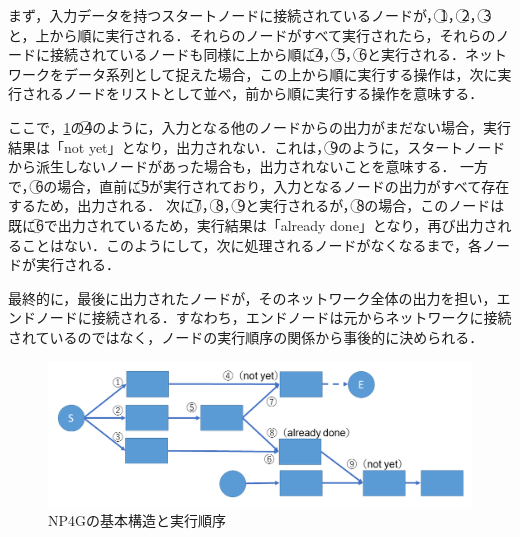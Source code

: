 \documentclass[exploratorypaper]{jsaiart} %
\begin{document}
まず，入力データを持つスタートノードに接続されているノードが，\textcircled{\scriptsize 1}，\textcircled{\scriptsize 2}，\textcircled{\scriptsize 3}と，上から順に実行される．それらのノードがすべて実行されたら，それらのノードに接続されているノードも同様に上から順に\textcircled{\scriptsize 4}，\textcircled{\scriptsize 5}，\textcircled{\scriptsize 6}と実行される．ネットワークをデータ系列として捉えた場合，この上から順に実行する操作は，次に実行されるノードをリストとして並べ，前から順に実行する操作を意味する．

ここで，\ref{fig:sequence}の\textcircled{\scriptsize 4}のように，入力となる他のノードからの出力がまだない場合，実行結果は「not yet」となり，出力されない．これは，\textcircled{\scriptsize 9}のように，スタートノードから派生しないノードがあった場合も，出力されないことを意味する．
一方で，\textcircled{\scriptsize 6}の場合，直前に\textcircled{\scriptsize 5}が実行されており，入力となるノードの出力がすべて存在するため，出力される．
次に\textcircled{\scriptsize 7}，\textcircled{\scriptsize 8}，\textcircled{\scriptsize 9}と実行されるが，\textcircled{\scriptsize 8}の場合，このノードは既に\textcircled{\scriptsize 6}で出力されているため，実行結果は「already done」となり，再び出力されることはない．このようにして，次に処理されるノードがなくなるまで，各ノードが実行される．

最終的に，最後に出力されたノードが，そのネットワーク全体の出力を担い，エンドノードに接続される．すなわち，エンドノードは元からネットワークに接続されているのではなく，ノードの実行順序の関係から事後的に決められる．

\begin{figure}[t]
    \begin{center}
        \includegraphics[width=130mm]{sequence.png}
    \end{center}
    \capwidth=90mm %
    \caption{NP4Gの基本構造と実行順序}
    \label{fig:sequence}
\end{figure}
\end{document}
